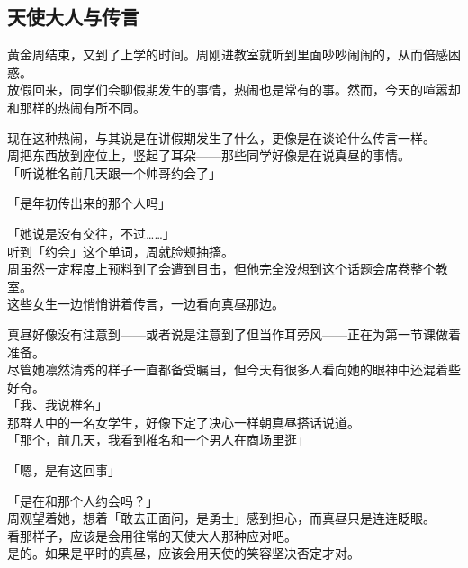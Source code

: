 \subsection{天使大人与传言}

黄金周结束，又到了上学的时间。周刚进教室就听到里面吵吵闹闹的，从而倍感困惑。\\

放假回来，同学们会聊假期发生的事情，热闹也是常有的事。然而，今天的喧嚣却和那样的热闹有所不同。

现在这种热闹，与其说是在讲假期发生了什么，更像是在谈论什么传言一样。\\

周把东西放到座位上，竖起了耳朵——那些同学好像是在说真昼的事情。\\

「听说椎名前几天跟一个帅哥约会了」

「是年初传出来的那个人吗」

「她说是没有交往，不过……」\\

听到「约会」这个单词，周就脸颊抽搐。\\

周虽然一定程度上预料到了会遭到目击，但他完全没想到这个话题会席卷整个教室。\\

这些女生一边悄悄讲着传言，一边看向真昼那边。

真昼好像没有注意到——或者说是注意到了但当作耳旁风——正在为第一节课做着准备。\\

尽管她凛然清秀的样子一直都备受瞩目，但今天有很多人看向她的眼神中还混着些好奇。\\

「我、我说椎名」\\

那群人中的一名女学生，好像下定了决心一样朝真昼搭话说道。\\

「那个，前几天，我看到椎名和一个男人在商场里逛」

「嗯，是有这回事」

「是在和那个人约会吗？」\\

周观望着她，想着「敢去正面问，是勇士」感到担心，而真昼只是连连眨眼。\\

看那样子，应该是会用往常的天使大人那种应对吧。\\

是的。如果是平时的真昼，应该会用天使的笑容坚决否定才对。\\

